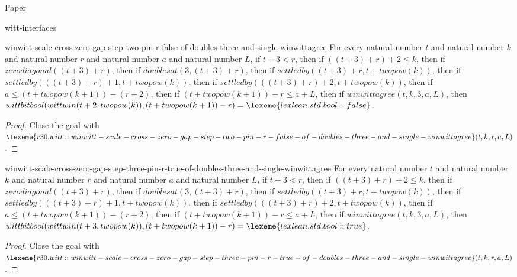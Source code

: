 \begin{lexlean}{Paper}
\begin{section}{witt-interfaces}
  \begin{theorem}{winwitt-scale-cross-zero-gap-step-two-pin-r-false-of-doubles-three-and-single-winwittagree}
  For every natural number \(t\) and natural number \(k\) and natural number \(r\) and natural number \(a\) and natural number \(L\), if \(t + 3 < r\), then if \(((t + 3) + r) + 2 ≤ k\), then if \(zerodiagonal((t + 3) + r)\), then if \(doublesat(3, (t + 3) + r)\), then if \(settledby((t + 3) + r, t + twopow(k))\), then if \(settledby(((t + 3) + r) + 1, t + twopow(k))\), then if \(settledby(((t + 3) + r) + 2, t + twopow(k))\), then if \(a ≤ (t + twopow(k + 1)) - (r + 2)\), then if \((t + twopow(k + 1)) - r ≤ a + L\), then if \(winwittagree(t, k, 3, a, L)\), then \(wittbitbool(wittwin(t + 2, twopow(k)), (t + twopow(k + 1)) - r) = \lexeme{lexlean.std.bool::false}\).
  \begin{proof}
  Close the goal with \(\lexeme{r30.witt::winwitt-scale-cross-zero-gap-step-two-pin-r-false-of-doubles-three-and-single-winwittagree}(t, k, r, a, L)\).
  \end{proof}
  \end{theorem}

  \begin{theorem}{winwitt-scale-cross-zero-gap-step-three-pin-r-true-of-doubles-three-and-single-winwittagree}
  For every natural number \(t\) and natural number \(k\) and natural number \(r\) and natural number \(a\) and natural number \(L\), if \(t + 3 < r\), then if \(((t + 3) + r) + 2 ≤ k\), then if \(zerodiagonal((t + 3) + r)\), then if \(doublesat(3, (t + 3) + r)\), then if \(settledby((t + 3) + r, t + twopow(k))\), then if \(settledby(((t + 3) + r) + 1, t + twopow(k))\), then if \(settledby(((t + 3) + r) + 2, t + twopow(k))\), then if \(a ≤ (t + twopow(k + 1)) - (r + 2)\), then if \((t + twopow(k + 1)) - r ≤ a + L\), then if \(winwittagree(t, k, 3, a, L)\), then \(wittbitbool(wittwin(t + 3, twopow(k)), (t + twopow(k + 1)) - r) = \lexeme{lexlean.std.bool::true}\).
  \begin{proof}
  Close the goal with \(\lexeme{r30.witt::winwitt-scale-cross-zero-gap-step-three-pin-r-true-of-doubles-three-and-single-winwittagree}(t, k, r, a, L)\).
  \end{proof}
  \end{theorem}


\end{section}
\end{lexlean}
